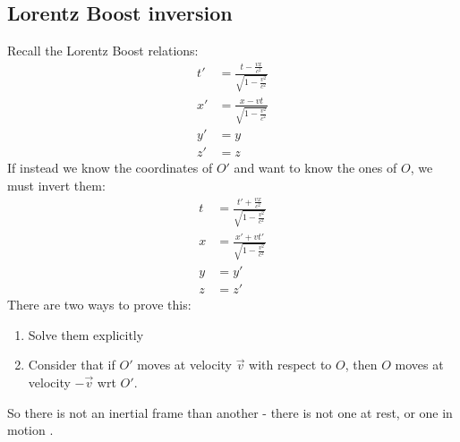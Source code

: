 \documentclass[../template.tex]{subfiles}
\begin{document}
\subsection{Lorentz Boost inversion}
Recall the Lorentz Boost relations:
\begin{align*}
t' &= \frac{t-\frac{v x}{c^2}}{\sqrt{1-\frac{v^2}{c^2}}}\\
x' &= \frac{x-vt}{\sqrt{1-\frac{v^2}{c^2}}}\\
y' &= y\\
z' &= z
\end{align*}
If instead we know the coordinates of $O'$ and want to know the ones of $O$, we must invert them:
\begin{align*}
t &= \frac{t'+\frac{vx}{c^2}}{\sqrt{1-\frac{v^2}{c^2}}}\\
x &= \frac{x'+vt'}{\sqrt{1-\frac{v^2}{c^2}}}\\
y &= y'\\
z &= z'
\end{align*}
There are two ways to prove this:
\begin{enumerate}
\item Solve them explicitly
\item Consider that if $O'$ moves at velocity $\vec{v}$ with respect to $O$, then $O$ moves at velocity $-\vec{v}$ wrt $O'$.
\end{enumerate}
So there is not an inertial frame  than another - there is not one at rest, or one in motion .\\
\end{document}
